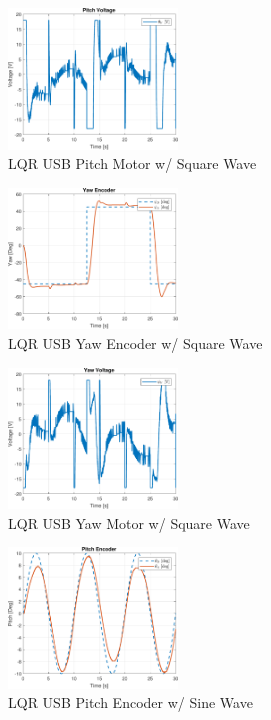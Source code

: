 \documentclass[letterpaper, 10pt, conference]{ieeeconf}
\begin{document}
\begin{figure}
  \centering
  \includegraphics[width=0.4\textwidth]{figs/matlab/LQR/P_USB/Pitch_Volt_LQR_USB_SQU}
  \caption{LQR USB Pitch Motor w/ Square Wave}
  \label{fig:Pitch_Volt_LQR_USB_SQU}
\end{figure}

\begin{figure}
  \centering
  \includegraphics[width=0.4\textwidth]{figs/matlab/LQR/P_USB/Yaw_Pos_LQR_USB_SQU}
  \caption{LQR USB Yaw Encoder w/ Square Wave}
  \label{fig:Yaw_Pos_LQR_USB_SQU}
\end{figure}

\begin{figure}
  \centering
  \includegraphics[width=0.4\textwidth]{figs/matlab/LQR/P_USB/Yaw_Volt_LQR_USB_SQU}
  \caption{LQR USB Yaw Motor w/ Square Wave}
  \label{fig:Yaw_Volt_LQR_USB_SQU}
\end{figure}

\begin{figure}
  \centering
  \includegraphics[width=0.4\textwidth]{figs/matlab/LQR/P_USB/Pitch_Pos_LQR_USB_SIN}
  \caption{LQR USB Pitch Encoder w/ Sine Wave}
  \label{fig:Pitch_Pos_LQR_USB_SIN}
\end{figure}
\end{document}
